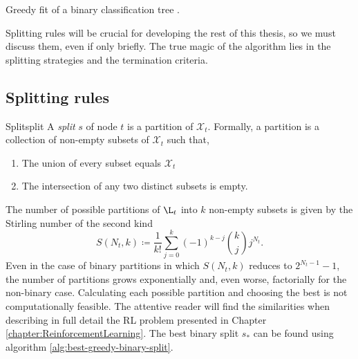 \begin{algorithm}
    \caption[Greedy tree fitting algorithm]{Greedy fit of a binary
        classification tree \cite[Ch.~3.3]{louppe2014}.}
    \label{alg:tree-fit}
\end{algorithm}

Splitting rules will be crucial for developing the rest of this thesis, so we
must discuss them, even if only briefly. The true magic of the algorithm lies in
the splitting strategies and the termination criteria.

\subsection{Splitting rules}

\begin{dfn}{Split}{split}
    A \emph{split} $s$ of node $t$ is a partition of $\mathcal{X}_t$. Formally, a partition is a collection of non-empty subsets of $\mathcal{X}_t$ such that,
    \begin{enumerate}
        \item The union of every subset equals $\mathcal{X}_t$
        \item The intersection of any two distinct subsets is empty.
    \end{enumerate}
\end{dfn}

The number of possible partitions of $\L_t$ into $k$ non-empty subsets is given
by the Stirling number of the second kind \cite{louppe2014}
\[
    S(N_t, k) \coloneqq \frac{1}{k!} \sum_{j=0}^{k} (-1)^{k-j} \binom{k}{j} j^{N_t}.
\]
Even in the case of binary partitions in which $S(N_t, k)$ reduces to $2^{N_t
-1}-1$, the number of partitions grows exponentially and, even worse,
factorially for the non-binary case. Calculating each possible partition and
choosing the best is not computationally feasible. The attentive reader will
find the similarities when describing in full detail the RL problem presented in
Chapter \ref{chapter:ReinforcementLearning}. The best binary split $s_*$ can be
found using algorithm \ref{alg:best-greedy-binary-split}.

